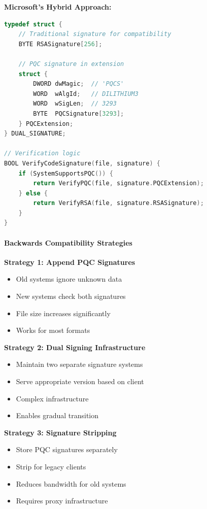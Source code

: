 \documentclass[11pt,a4paper]{article}
\begin{document}
\textbf{Microsoft's Hybrid Approach:}

\begin{lstlisting}[language=C, caption=Dual-Signature Format]
typedef struct {
    // Traditional signature for compatibility
    BYTE RSASignature[256];
    
    // PQC signature in extension
    struct {
        DWORD dwMagic;  // 'PQCS'
        WORD  wAlgId;   // DILITHIUM3
        WORD  wSigLen;  // 3293
        BYTE  PQCSignature[3293];
    } PQCExtension;
} DUAL_SIGNATURE;

// Verification logic
BOOL VerifyCodeSignature(file, signature) {
    if (SystemSupportsPQC()) {
        return VerifyPQC(file, signature.PQCExtension);
    } else {
        return VerifyRSA(file, signature.RSASignature);
    }
}
\end{lstlisting}

\paragraph{Backwards Compatibility Strategies}

\textbf{Strategy 1: Append PQC Signatures}
\begin{itemize}
    \item Old systems ignore unknown data
    \item New systems check both signatures
    \item File size increases significantly
    \item Works for most formats
\end{itemize}

\textbf{Strategy 2: Dual Signing Infrastructure}
\begin{itemize}
    \item Maintain two separate signature systems
    \item Serve appropriate version based on client
    \item Complex infrastructure
    \item Enables gradual transition
\end{itemize}

\textbf{Strategy 3: Signature Stripping}
\begin{itemize}
    \item Store PQC signatures separately
    \item Strip for legacy clients
    \item Reduces bandwidth for old systems
    \item Requires proxy infrastructure
\end{itemize}
\end{document}
